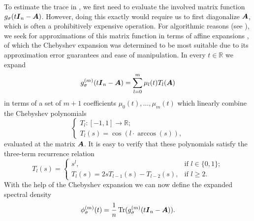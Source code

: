\documentclass[12pt]{article}
\begin{document}
To estimate the trace in , we first need to evaluate the involved matrix function $g_{\sigma}(t\boldsymbol{I}_n - \boldsymbol{A})$. However, doing this exactly would require us to first diagonalize $\boldsymbol{A}$, which is often a prohibitively expensive operation. For algorithmic reasons (see ), we seek for approximations of this matrix function in terms of affine expansions , of which the Chebyshev expansion was determined to be most suitable due to its approximation error guarantees and ease of manipulation. In every $t \in \mathbb{R}$ we expand 
\begin{equation}
    g_{\sigma}^{(m)}(t\boldsymbol{I}_n - \boldsymbol{A}) = \sum_{l=0}^{m} \mu_l(t) T_l(\boldsymbol{A})
    \label{equ:matrix-expansion}
\end{equation}
in terms of a set of $m+1$ coefficients $\mu_0(t), \dots, \mu_m(t)$ which linearly combine the Chebyshev polynomials
\begin{equation}
    \begin{cases}
        T_l : [-1, 1] \to \mathbb{R}; \\
        T_l(s) = \cos(l \cdot \arccos(s)),
    \end{cases}
    \label{equ:chebyshev-polynomial}
\end{equation}
evaluated at the matrix $\boldsymbol{A}$. It is easy to verify that these polynomials satisfy the three-term recurrence relation
\begin{equation}
    T_l(s) =
    \begin{cases}
        s^l, & \text{if $l \in \{0, 1\}$}; \\
        T_l(s) = 2 s T_{l-1}(s) - T_{l-2}(s), & \text{if $l \geq 2$.}
    \end{cases}
    \label{equ:chebyshev-recurrence}
\end{equation}
With the help of the Chebyshev expansion  we can now define the expanded spectral density
\begin{equation}
    \phi_{\sigma}^{(m)}(t) =  \frac{1}{n} \operatorname{Tr}(g_{\sigma}^{(m)}(t \boldsymbol{I}_n - \boldsymbol{A})).
    \label{equ:expanded-spectral-density}
\end{equation}
\end{document}
